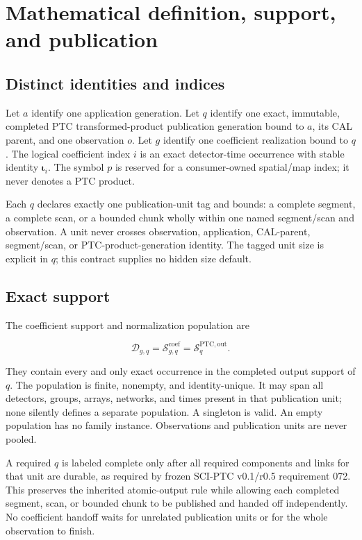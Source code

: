 \section{Mathematical definition, support, and publication}

\subsection{Distinct identities and indices}

Let \(a\) identify one application generation. Let \(q\) identify one exact,
immutable, completed PTC transformed-product publication generation bound to
\(a\), its CAL parent, and one observation \(o\). Let \(g\) identify one
coefficient realization bound to \(q\). The logical coefficient index \(i\)
is an exact detector-time occurrence with stable identity
\(\boldsymbol\iota_i\). The symbol \(p\) is reserved for a consumer-owned
spatial/map index; it never denotes a PTC product.

Each \(q\) declares exactly one publication-unit tag and bounds: a complete
segment, a complete scan, or a bounded chunk wholly within one named
segment/scan and observation. A unit never crosses observation, application,
CAL-parent, segment/scan, or PTC-product-generation identity. The tagged unit
size is explicit in \(q\); this contract supplies no hidden size default.

\subsection{Exact support}

The coefficient support and normalization population are

\begin{equation}
 \mathcal D_{g,q}=\mathcal S^{\mathrm{coef}}_{g,q}
 =\mathcal S^{\mathrm{PTC,out}}_q .
 \label{eq:domain}
\end{equation}

They contain every and only exact occurrence in the completed output support
of \(q\). The population is finite, nonempty, and identity-unique. It may span
all detectors, groups, arrays, networks, and times present in that publication
unit; none silently defines a separate population. A singleton is valid.
An empty population has no family instance. Observations and publication
units are never pooled.

A required \(q\) is labeled complete only after all required components and
links for that unit are durable, as required by frozen SCI-PTC v0.1/r0.5
requirement 072. This preserves the inherited atomic-output rule while
allowing each completed segment, scan, or bounded chunk to be published and
handed off independently. No coefficient handoff waits for unrelated
publication units or for the whole observation to finish.

